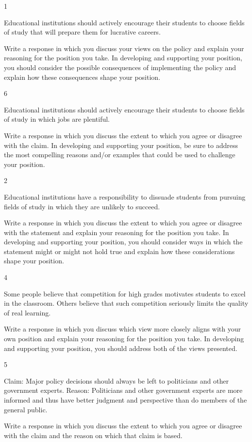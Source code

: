 \documentclass[]{article}
\begin{document}
1

Educational institutions should actively encourage their students to
choose fields of study that will prepare them for lucrative careers.

Write a response in which you discuss your views on the policy and
explain your reasoning for the position you take. In developing and
supporting your position, you should consider the possible consequences
of implementing the policy and explain how these consequences shape your
position.

6

Educational institutions should actively encourage their students to
choose fields of study in which jobs are plentiful.

Write a response in which you discuss the extent to which you agree or
disagree with the claim. In developing and supporting your position, be
sure to address the most compelling reasons and/or examples that could
be used to challenge your position.

2

Educational institutions have a responsibility to dissuade students from
pursuing fields of study in which they are unlikely to succeed.

Write a response in which you discuss the extent to which you agree or
disagree with the statement and explain your reasoning for the position
you take. In developing and supporting your position, you should
consider ways in which the statement might or might not hold true and
explain how these considerations shape your position.

4

Some people believe that competition for high grades motivates students
to excel in the classroom. Others believe that such competition
seriously limits the quality of real learning.

Write a response in which you discuss which view more closely aligns
with your own position and explain your reasoning for the position you
take. In developing and supporting your position, you should address
both of the views presented.

5

Claim: Major policy decisions should always be left to politicians and
other government experts. Reason: Politicians and other government
experts are more informed and thus have better judgment and perspective
than do members of the general public.

Write a response in which you discuss the extent to which you agree or
disagree with the claim and the reason on which that claim is based.
\end{document}
